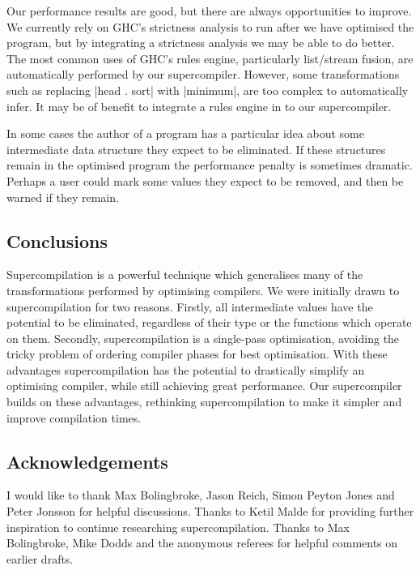 \documentclass[draft]{sigplanconf}
\begin{document}
Our performance results are good, but there are always opportunities to improve. We currently rely on GHC's strictness analysis to run after we have optimised the program, but by integrating a strictness analysis we may be able to do better. The most common uses of GHC's rules engine, particularly list/stream fusion, are automatically performed by our supercompiler. However, some transformations such as replacing |head . sort| with |minimum|, are too complex to automatically infer. It may be of benefit to integrate a rules engine in to our supercompiler.

In some cases the author of a program has a particular idea about some intermediate data structure they expect to be eliminated. If these structures remain in the optimised program the performance penalty is sometimes dramatic. Perhaps a user could mark some values they expect to be removed, and then be warned if they remain.

\subsection{Conclusions}

Supercompilation is a powerful technique which generalises many of the transformations performed by optimising compilers. We were initially drawn to supercompilation for two reasons. Firstly, all intermediate values have the potential to be eliminated, regardless of their type or the functions which operate on them. Secondly, supercompilation is a single-pass optimisation, avoiding the tricky problem of ordering compiler phases for best optimisation. With these advantages supercompilation has the potential to drastically simplify an optimising compiler, while still achieving great performance. Our supercompiler builds on these advantages, rethinking supercompilation to make it simpler and improve compilation times.

\subsection*{Acknowledgements}

I would like to thank Max Bolingbroke, Jason Reich, Simon Peyton Jones and Peter Jonsson for helpful discussions. Thanks to Ketil Malde for providing further inspiration to continue researching supercompilation. Thanks to Max Bolingbroke, Mike Dodds and the anonymous referees for helpful comments on earlier drafts.



\end{document}
